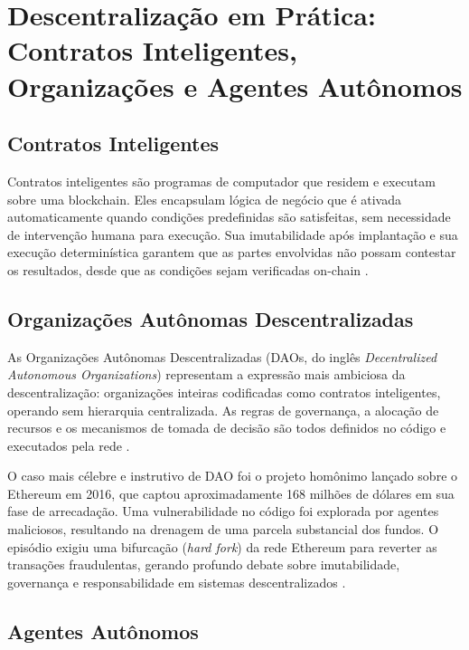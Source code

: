 \documentclass[12pt,a4paper]{report}
\begin{document}
\section[Descentralização em Prática]{Descentralização em Prática: Contratos Inteligentes, Organizações e Agentes Autônomos}

\subsection{Contratos Inteligentes}

Contratos inteligentes são programas de computador que residem e executam sobre uma blockchain. Eles encapsulam lógica de negócio que é ativada automaticamente quando condições predefinidas são satisfeitas, sem necessidade de intervenção humana para execução. Sua imutabilidade após implantação e sua execução determinística garantem que as partes envolvidas não possam contestar os resultados, desde que as condições sejam verificadas on-chain \cite{Bashir2023}.

\subsection{Organizações Autônomas Descentralizadas}

As Organizações Autônomas Descentralizadas (DAOs, do inglês \textit{Decentralized Autonomous Organizations}) representam a expressão mais ambiciosa da descentralização: organizações inteiras codificadas como contratos inteligentes, operando sem hierarquia centralizada. As regras de governança, a alocação de recursos e os mecanismos de tomada de decisão são todos definidos no código e executados pela rede \cite{Bashir2023}.

O caso mais célebre e instrutivo de DAO foi o projeto homônimo lançado sobre o Ethereum em 2016, que captou aproximadamente 168 milhões de dólares em sua fase de arrecadação. Uma vulnerabilidade no código foi explorada por agentes maliciosos, resultando na drenagem de uma parcela substancial dos fundos. O episódio exigiu uma bifurcação (\textit{hard fork}) da rede Ethereum para reverter as transações fraudulentas, gerando profundo debate sobre imutabilidade, governança e responsabilidade em sistemas descentralizados \cite{Bashir2023}.

\subsection{Agentes Autônomos}
\end{document}
